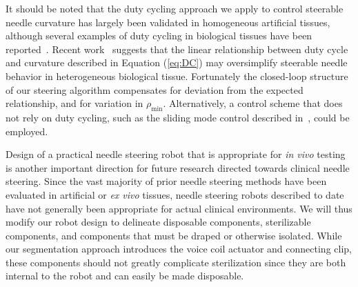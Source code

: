It should be noted that the duty cycling approach we apply to control steerable needle curvature has largely been validated in homogeneous artificial tissues, although several examples of duty cycling in biological tissues have been reported~\cite{Engh2010,Patil2014,Swaney2013}. Recent work~\cite{Patil2014} suggests that the linear relationship between duty cycle and curvature described in Equation (\ref{eq:DC}) may oversimplify steerable needle behavior in heterogeneous biological tissue. Fortunately the closed-loop structure of our steering algorithm compensates for deviation from the expected relationship, and for variation in $\rho_\text{min}$. Alternatively, a control scheme that does not rely on duty cycling, such as the sliding mode control described in~\cite{Rucker2013}, could be employed.

Design of a practical needle steering robot that is appropriate for \textit{in vivo} testing is another important direction for future research directed towards clinical needle steering. Since the vast majority of prior needle steering methods have been evaluated in artificial or \textit{ex vivo} tissues, needle steering robots described to date have not generally been appropriate for actual clinical environments. We will thus modify our robot design to delineate disposable components, sterilizable components, and components that must be draped or otherwise isolated. While our segmentation approach introduces the voice coil actuator and connecting clip, these components should not greatly complicate sterilization since they are both internal to the robot and can easily be made disposable.
